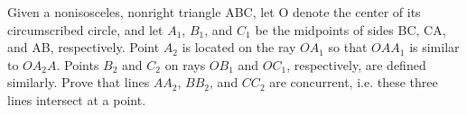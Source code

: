 Given a nonisosceles, nonright triangle ABC, let O denote the center of its circumscribed circle, and let $A_1$,  $B_1$,  and $C_1$ be the midpoints of sides BC, CA, and AB, respectively. Point $A_2$ is located on the ray $OA_1$ so that $OAA_1$ is similar to $OA_2A$. Points $B_2$ and $C_2$ on rays $OB_1$ and $OC_1$,  respectively, are defined similarly. Prove that lines $AA_2$,  $BB_2$,  and $CC_2$ are concurrent, i.e. these three lines intersect at a point.